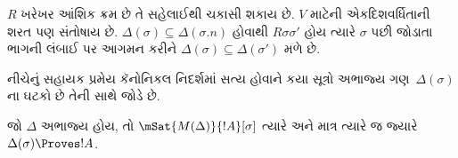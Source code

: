 $R$ ખરેખર આંશિક ક્રમ છે તે સહેલાઈથી ચકાસી શકાય છે.
$V$ માટેની એકદિશવર્ધિતાની શરત પણ સંતોષાય છે.
$\Delta(\sigma) \subseteq \Delta(\sigma.n)$ હોવાથી
$R\sigma\sigma'$ હોય ત્યારે $\sigma$ પછી જોડાતા ભાગની
લંબાઈ પર આગમન કરીને
$\Delta(\sigma) \subseteq \Delta(\sigma')$ મળે છે.
\endgroup

\begingroup
\makeatletter{}\makeatother


\label{guunit:OLP-0508}


નીચેનું સહાયક પ્રમેય કૅનોનિકલ નિદર્શમાં સત્ય હોવાને
કયા સૂત્રો અભાજ્ય ગણ~$\Delta(\sigma)$ના ઘટકો
છે તેની સાથે જોડે છે.

\begin{lem}
  જો $\Delta$ અભાજ્ય હોય, તો $\mSat{M(\Delta)}{!A}[\sigma]$
  ત્યારે અને માત્ર ત્યારે જ જ્યારે
  $\Delta(\sigma) \Proves !A$.
\end{lem}

